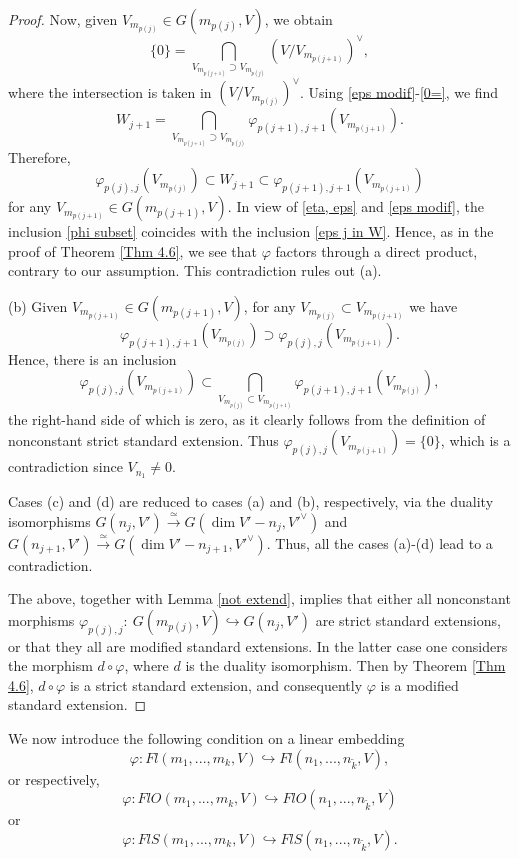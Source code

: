 \documentclass[12pt]{amsart}
\renewcommand{\phi}{\varphi}
\theoremstyle{definition}
\begin{document}
\begin{proof}
Now, given $V_{m_{p(j)}}\in G(m_{p(j)},V)$, we obtain
\begin{equation}\label{0=}
\{0\}=\underset{V_{m_{p(j+1)}}\supset V_{m_{p(j)}}}{\bigcap}
(V/V_{m_{p(j+1)}})^{\vee}, 
\end{equation}
where the intersection is taken in $(V/V_{m_{p(j)}})
^{\vee}$. Using \eqref{eps modif}-\eqref{0=}, we find 
$$W_{j+1}=\underset{V_{m_{p(j+1)}}\supset V_{m_{p(j)}}}
{\bigcap}\phi_{p(j+1),j+1}(V_{m_{p(j+1)}}).$$ 
Therefore, 
\begin{equation}\label{phi subset}
\phi_{p(j),j}(V_{m_{p(j)}})\subset W_{j+1}\subset 
\varphi_{p(j+1),j+1}(V_{m_{p(j+1)}})
\end{equation}
for any $V_{m_{p(j+1)}}\in G(m_{p(j+1)},V)$. In view of 
\eqref{eta, eps} and \eqref{eps modif}, the inclusion
\eqref{phi subset} coincides with the inclusion \eqref{eps j 
in W}. Hence, as in the proof of Theorem \ref{Thm 4.6}, we see 
that $\phi$ factors through a direct product, contrary to our 
assumption. This contradiction rules out (a).

(b) Given $V_{m_{p(j+1)}}\in G(m_{p(j+1)},V)$, for any 
$V_{m_{p(j)}}\subset V_{m_{p(j+1)}}$ we have 
$$\phi_{p(j+1),j+1}(V_{m_{p(j)}})\supset\phi_{p(j),j}
(V_{m_{p(j+1)}}).$$ 
Hence, there is an inclusion $$\phi_{p(j),j}
(V_{m_{p(j+1)}})\subset\underset{V_{m_{p(j)}}\subset 
V_{m_{p(j+1)}}}{\bigcap}\phi_{p(j+1),j+1}(V_{m_{p(j)}}),$$ 
the right-hand side of which is zero, as it clearly follows from
the definition of nonconstant strict standard extension. Thus
$\phi_{p(j),j}(V_{m_{p(j+1)}})=\{0\}$, which is a contradiction
since $V_{n_1}\ne0$.

Cases (c) and (d) are reduced to cases (a) and  (b), 
respectively, via the duality isomorphisms $G(n_j,V')
\xrightarrow{\simeq} G(\dim V'-n_j,V'^{\vee})$ and $G(n_{j+1},
V')\xrightarrow{\simeq} G(\dim V'-n_{j+1},V'^{\vee})$. 
Thus, all the cases (a)-(d) lead to a contradiction. 

The above,
together with Lemma \ref{not extend}, implies that either all
nonconstant morphisms $\phi_{p(j),j}:\ G(m_{p(j)},V)
\hookrightarrow G(n_j,V')$ are strict standard extensions, or
that they all are modified standard extensions. In the latter 
case one considers the morphism  $d\circ\phi$, where $d$ is the
duality isomorphism. Then by Theorem \ref{Thm 4.6}, 
$d\circ\phi$ is a strict standard extension, and consequently
$\phi$ is a modified standard extension.
\end{proof}

We now introduce the following condition on a linear embedding
$$
\phi:Fl(m_1,...,m_k,V)\hookrightarrow Fl(n_1,...,
n_{\tilde{k}},V),
$$ 
or respectively,
$$
\phi:FlO(m_1,...,m_k,V)\hookrightarrow FlO(n_1,...,
n_{\tilde{k}},V)
$$
or
$$
\phi:FlS(m_1,...,m_k,V)\hookrightarrow FlS(n_1,...,
n_{\tilde{k}},V).
$$
\end{document}
